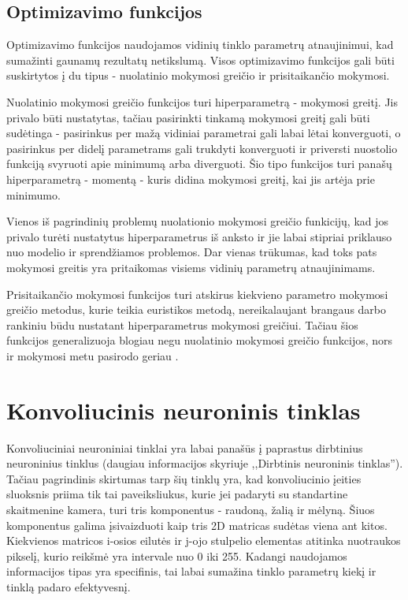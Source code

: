 \documentclass{VUMIFPSkursinis}
\begin{document}
\subsection{Optimizavimo funkcijos}
Optimizavimo funkcijos naudojamos vidinių tinklo parametrų atnaujinimui, kad sumažinti gaunamų rezultatų netikslumą. 
Visos optimizavimo funkcijos gali būti suskirtytos į du tipus - nuolatinio mokymosi greičio ir prisitaikančio mokymosi.

Nuolatinio mokymosi greičio funkcijos turi hiperparametrą - mokymosi greitį. Jis privalo būti nustatytas, tačiau 
pasirinkti tinkamą mokymosi greitį gali būti sudėtinga - pasirinkus per mažą vidiniai parametrai gali labai lėtai 
konverguoti, o pasirinkus per didelį parametrams gali trukdyti konverguoti ir priversti nuostolio funkciją svyruoti
apie minimumą arba diverguoti. Šio tipo funkcijos turi panašų hiperparametrą - momentą - kuris didina mokymosi greitį, 
kai jis artėja prie minimumo. 

Vienos iš pagrindinių problemų nuolationio mokymosi greičio funkicijų, kad jos privalo turėti nustatytus hiperparametrus 
iš anksto ir jie labai stipriai priklauso nuo modelio ir sprendžiamos problemos. Dar vienas trūkumas, kad toks pats 
mokymosi greitis yra pritaikomas visiems vidinių parametrų atnaujinimams.

Prisitaikančio mokymosi funkcijos turi atskirus kiekvieno parametro mokymosi greičio metodus, kurie teikia euristikos 
metodą, nereikalaujant brangaus darbo rankiniu būdu nustatant hiperparametrus mokymosi greičiui. Tačiau šios funkcijos 
generalizuoja blogiau negu nuolatinio mokymosi greičio funkcijos, nors ir mokymosi metu pasirodo geriau \cite{2017arXiv170508292W}.



\section{Konvoliucinis neuroninis tinklas}
Konvoliuciniai neuroniniai tinklai yra labai panašūs į paprastus dirbtinius neuroninius tinklus (daugiau informacijos skyriuje ,,Dirbtinis neuroninis
tinklas''). Tačiau pagrindinis skirtumas tarp šių tinklų yra, kad konvoliucinio įeities sluoksnis priima tik tai paveiksliukus, 
kurie jei padaryti su standartine skaitmenine kamera, turi tris komponentus - raudoną, žalią ir mėlyną. Šiuos komponentus galima 
įsivaizduoti kaip tris 2D matricas sudėtas viena ant kitos. Kiekvienos matricos i-osios eilutės ir j-ojo stulpelio elementas 
atitinka nuotraukos pikselį, kurio reikšmė yra intervale nuo 0 iki 255. Kadangi naudojamos informacijos tipas yra specifinis, 
tai labai sumažina tinklo parametrų kiekį ir tinklą padaro efektyvesnį.
\end{document}

